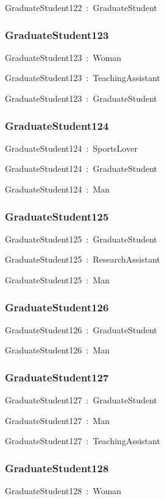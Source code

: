 \documentclass{article}
\begin{document}
GraduateStudent122~:~GraduateStudent

\subsubsection*{GraduateStudent123}

GraduateStudent123~:~Woman

GraduateStudent123~:~TeachingAssistant

GraduateStudent123~:~GraduateStudent

\subsubsection*{GraduateStudent124}

GraduateStudent124~:~SportsLover

GraduateStudent124~:~GraduateStudent

GraduateStudent124~:~Man

\subsubsection*{GraduateStudent125}

GraduateStudent125~:~GraduateStudent

GraduateStudent125~:~ResearchAssistant

GraduateStudent125~:~Man

\subsubsection*{GraduateStudent126}

GraduateStudent126~:~GraduateStudent

GraduateStudent126~:~Man

\subsubsection*{GraduateStudent127}

GraduateStudent127~:~GraduateStudent

GraduateStudent127~:~Man

GraduateStudent127~:~TeachingAssistant

\subsubsection*{GraduateStudent128}

GraduateStudent128~:~Woman
\end{document}
